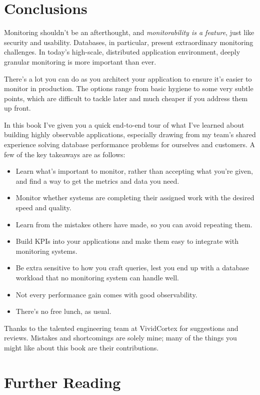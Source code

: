 \documentclass{vivid_layout}
\begin{document}
\section{Conclusions}

Monitoring shouldn't be an afterthought, and \emph{monitorability is a feature},
just like security and usability. Databases, in particular, present
extraordinary monitoring challenges. In today's high-scale, distributed
application environment, deeply granular monitoring is more important than ever.

There's a lot you can do as you architect your application to ensure it's 
easier to monitor in production. The options range from basic hygiene to some very
subtle points, which are difficult to tackle later and much cheaper if you
address them up front.

In this book I've given you a quick end-to-end tour of what I've learned about
building highly observable applications, especially drawing from my team's
shared experience solving database performance problems for ourselves and
customers.  A few of the key takeaways are as follows:

\begin{itemize}
\item Learn what's important to monitor, rather than accepting what you're
given, and find a way to get the metrics and data you need.
\item Monitor whether systems are completing their assigned work with the
desired speed and quality.
\item Learn from the mistakes others have made, so you can avoid repeating them.
\item Build KPIs into your applications and make them easy to integrate with
monitoring systems.
\item Be extra sensitive to how you craft queries, lest you end up with a
database workload that no monitoring system can handle well.
\item Not every performance gain comes with good observability.
\item There's no free lunch, as usual.
\end{itemize}

Thanks to the talented engineering team at VividCortex for suggestions and
reviews. Mistakes and shortcomings are solely mine; many of the things you might
like about this book are their contributions.

\section{Further Reading}
\end{document}
